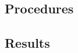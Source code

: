 \subsection{Procedures}
\label{subsec:chapter3:simulation:procedures}

\subsection{Results}
\label{subsec:chapter3:simulation:results}

%
%
